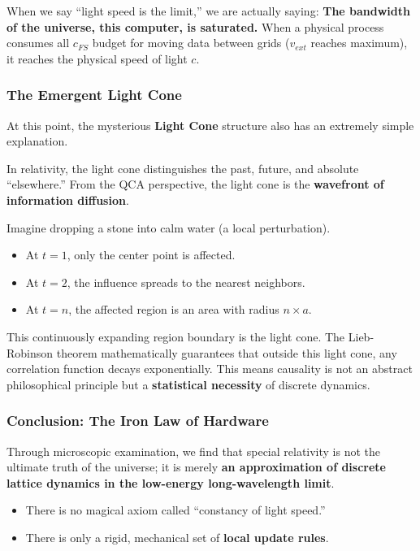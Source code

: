 When we say ``light speed is the limit,'' we are actually saying: \textbf{The bandwidth of the universe, this computer, is saturated.} When a physical process consumes all $c_{FS}$ budget for moving data between grids ($v_{ext}$ reaches maximum), it reaches the physical speed of light $c$.

\subsubsection{The Emergent Light Cone}

At this point, the mysterious \textbf{Light Cone} structure also has an extremely simple explanation.

In relativity, the light cone distinguishes the past, future, and absolute ``elsewhere.'' From the QCA perspective, the light cone is the \textbf{wavefront of information diffusion}.

Imagine dropping a stone into calm water (a local perturbation).

\begin{itemize}
\item At $t=1$, only the center point is affected.

\item At $t=2$, the influence spreads to the nearest neighbors.

\item At $t=n$, the affected region is an area with radius $n \times a$.
\end{itemize}

This continuously expanding region boundary is the light cone. The Lieb-Robinson theorem mathematically guarantees that outside this light cone, any correlation function decays exponentially. This means causality is not an abstract philosophical principle but a \textbf{statistical necessity} of discrete dynamics.

\subsubsection{Conclusion: The Iron Law of Hardware}

Through microscopic examination, we find that special relativity is not the ultimate truth of the universe; it is merely \textbf{an approximation of discrete lattice dynamics in the low-energy long-wavelength limit}.

\begin{itemize}
\item There is no magical axiom called ``constancy of light speed.''

\item There is only a rigid, mechanical set of \textbf{local update rules}.
\end{itemize}

